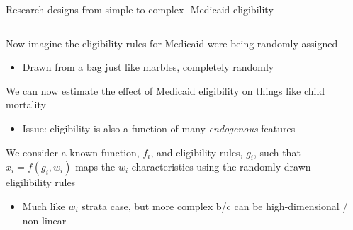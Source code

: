 \documentclass[notes,11pt, aspectratio=169]{beamer}
\newenvironment{wideitemize}{\itemize\addtolength{\itemsep}{10pt}}{\enditemize}
\begin{document}
\begin{frame}{Research designs from simple to complex- Medicaid eligibility}
\begin{columns}[T] %
\begin{column}{.75\textwidth}
  \begin{wideitemize}
  \item Now imagine the eligibility rules for Medicaid were being  randomly assigned
    \begin{itemize}
    \item Drawn from a bag just like marbles, completely randomly
    \end{itemize}
  \item We can now estimate the effect of Medicaid eligibility on things like child mortality
    \begin{itemize}
    \item Issue: eligibility is also a function of many \emph{endogenous} features
    \end{itemize}
    \item We consider a known
      function, $f_{i}$, and eligibility rules, $g_{i}$, such that
      $x_{i} = f(g_{i}, w_{i})$ maps the $w_{i}$ characteristics using
      the randomly drawn eligilibility rules
      \begin{itemize}
      \item Much like $w_{i}$ strata case, but more complex b/c can be high-dimensional / non-linear
      \end{itemize}
  \end{wideitemize}
\end{column}%
\hfill%
\begin{column}{.25\textwidth}
\end{column}%
\end{columns}
\end{frame}
\end{document}
